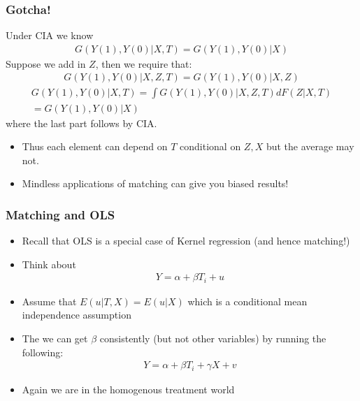 \documentclass[xcolor=pdftex,dvipsnames,table,mathserif,aspectratio=169]{beamer}
\begin{document}
\begin{frame}
\frametitle{Gotcha!}
\small
Under CIA we know
\begin{eqnarray*}
G(Y(1),Y(0) | X, T) = G(Y(1),Y(0) | X)
\end{eqnarray*}
Suppose we add in $Z$, then we require that:
\begin{eqnarray*}
G(Y(1),Y(0) | X, Z, T) = G(Y(1),Y(0) | X, Z)
\end{eqnarray*}
\begin{eqnarray*}
G(Y(1),Y(0) | X, T) = \int G(Y(1),Y(0) | X, Z, T) dF(Z | X,T) \\
= G(Y(1),Y(0) | X)
\end{eqnarray*}
where the last part follows by CIA.
\begin{itemize}
\item Thus each element can depend on $T$ conditional on $Z,X$ but the average may not.
\item Mindless applications of matching can give you biased results!
\end{itemize}
\end{frame}


\begin{frame}
\frametitle{Matching and OLS}
\begin{itemize}
\item Recall that OLS is a special case of Kernel regression (and hence matching!)
\item Think about
\begin{eqnarray*}
Y  = \alpha + \beta T_i + u
\end{eqnarray*}
\item Assume that $E(u | T,X) = E(u | X)$ which is a conditional mean independence assumption
\item The we can get $\beta$ consistently (but not other variables) by running the following:
\begin{eqnarray*}
Y = \alpha + \beta T_i + \gamma X + v
\end{eqnarray*}
\item Again we are in the homogenous treatment world
\end{itemize}
\end{frame}
\end{document}
